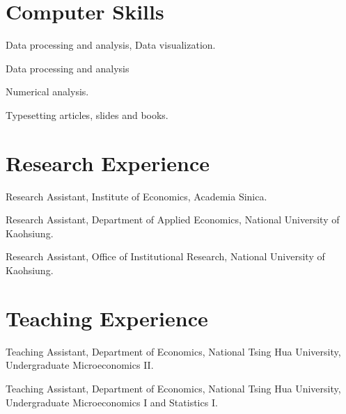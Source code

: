 \documentclass[utf8, 12pt]{article} %
\begin{document}
\section{Computer Skills}

{Data processing and analysis, Data visualization.}

{Data processing and analysis}

{Numerical analysis.}

{Typesetting articles, slides and books.}


\section{Research Experience}

{Research Assistant, Institute of Economics, Academia Sinica.}

{Research Assistant, Department of Applied Economics, National University of Kaohsiung.}

{Research Assistant, Office of Institutional Research, National University of Kaohsiung.}


\section{Teaching Experience}

{
Teaching Assistant, Department of Economics,
National Tsing Hua University, Undergraduate Microeconomics II.
}

{
Teaching Assistant, Department of Economics,
National Tsing Hua University,
Undergraduate Microeconomics I and Statistics I.
}

\end{document}

